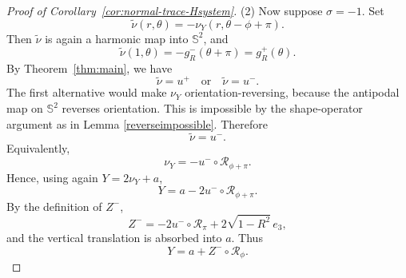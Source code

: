 \documentclass[10pt,a4paper]{amsart}
\newcommand{\RR}{\mathbb R}
\newcommand{\Rot}{\mathcal R}
\newcommand{\Sph}{\mathbb{S}^2}
\newcommand{\eiii}{e_3}
\begin{document}
\begin{proof}[Proof of Corollary~\ref{cor:normal-trace-Hsystem}]
\smallskip
(2) Now suppose $\sigma=-1$. Set
\[
\widetilde\nu(r,\theta)=-\nu_Y(r,\theta-\phi+\pi).
\]
Then $\widetilde\nu$ is again a harmonic map into $\Sph$, and
\[
\widetilde\nu(1,\theta)
=-g_R^-(\theta+\pi)
=g_R^+(\theta).
\]
By Theorem~\ref{thm:main}, we have
\[
\widetilde\nu=u^+\quad\text{or}\quad \widetilde\nu=u^-.
\]
The first alternative would make $\nu_Y$ orientation-reversing, because the antipodal map on $\Sph$ reverses orientation. This is impossible
by the shape-operator argument as in Lemma \ref{reverseimpossible}. Therefore
\[
\widetilde\nu=u^-.
\]
Equivalently,
\[
\nu_Y=-u^-\circ\Rot_{\phi+\pi}.
\]
Hence, using again $Y=2\nu_Y+a$,
\[
Y=a-2u^-\circ\Rot_{\phi+\pi}.
\]
By the definition of $Z^-$,
\[
Z^-= -2u^-\circ\Rot_\pi+2\sqrt{1-R^2}\,\eiii,
\]
and the vertical translation is absorbed into $a$. Thus
\[
Y=a+Z^-\circ\Rot_\phi.
\]

\end{proof}
\end{document}

